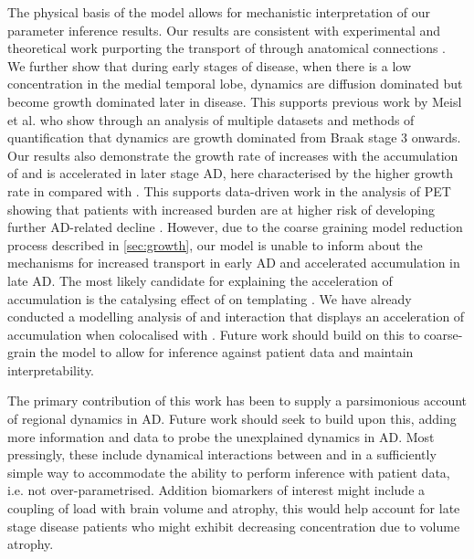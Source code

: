The physical basis of the model allows for mechanistic interpretation of our
parameter inference results. Our results are consistent with experimental and
theoretical work purporting the transport of \TP through anatomical connections
\cite{liu2012trans,devos2018synaptic,vogel2020spread}. We further show that
during early stages of disease, when there is a low \TP concentration in the
medial temporal lobe, \TP dynamics are diffusion dominated but become growth
dominated later in disease. This supports previous work by Meisl et al.
\cite{meisl2021vivo} who show through an analysis of multiple datasets and
methods of \TP quantification that \TP dynamics are growth dominated from Braak
stage 3 onwards. Our results also demonstrate the growth rate of \TP increases
with the accumulation of \TP and is accelerated in later stage AD, here
characterised by the higher growth rate in \ABP \TPP compared with \ABP \TPN.
This supports data-driven work in the analysis of \TP PET showing that patients
with increased \TP burden are at higher risk of developing further AD-related
decline \cite{ossenkoppele2022amyloid}. However, due to the coarse graining
model reduction process described in \cref{sec:growth}, our model is
unable to inform about the mechanisms for increased transport in early AD and
accelerated \TP accumulation in late AD. The most likely candidate for
explaining the acceleration of \TP accumulation is the catalysing effect of \AB
on \TP templating \cite{bennett2017enhanced,he2018amyloid}. We have already 
conducted a modelling analysis of \AB and \TP interaction that displays an 
acceleration of \TP accumulation when colocalised with \AB \cite{thompson2020}.
Future work should build on this to coarse-grain the model to allow for 
inference against patient data and maintain interpretability. 

The primary contribution of this work has been to supply a parsimonious account 
of regional \TP dynamics in AD. Future work should seek to build upon this, 
adding more information and data to probe the unexplained dynamics in AD. Most 
pressingly, these include dynamical interactions between \AB and \TP in a 
sufficiently simple way to accommodate the ability to perform inference with 
patient data, i.e. not over-parametrised. Addition biomarkers of interest 
might include a coupling of \TP load with brain volume and atrophy, this would 
help account for late stage disease patients who might exhibit decreasing \TP 
concentration due to volume atrophy.